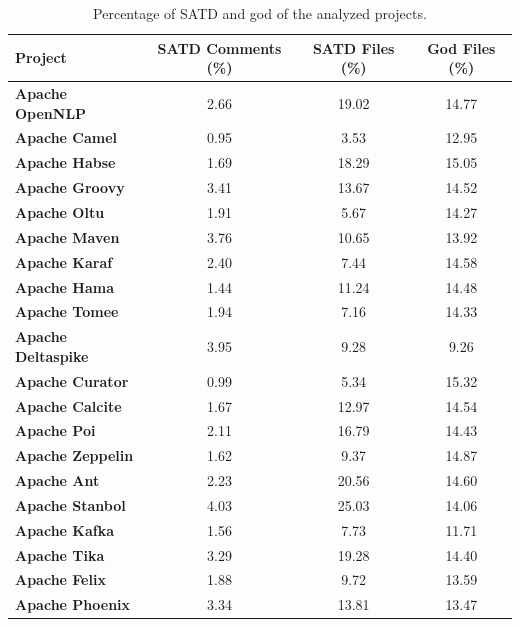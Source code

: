\begin{landscape}
	
	
	\begin{table}[htbp]
		\small
		\centering
		\caption{Percentage of SATD and god of the analyzed projects.}
		\begin{adjustbox}{width=1.0\textwidth}
			
			
			\begin{tabular}{l|c|c|c}
				\hline
				\textbf{Project}  & \textbf{SATD Comments (\%)}  & \textbf{SATD Files (\%)} & \textbf{God Files (\%)} \\ \hline
				\textbf{Apache OpenNLP} &  2.66 & 19.02 & 14.77   \\ \hline
				\textbf{Apache Camel} &  0.95 & 3.53 & 12.95    \\ \hline
				\textbf{Apache Habse} & 1.69 &  18.29 & 15.05    \\ \hline
				\textbf{Apache Groovy} &  3.41 & 13.67 & 14.52    \\ \hline
				\textbf{Apache Oltu} &  1.91 & 5.67 & 14.27    \\ \hline
				\textbf{Apache Maven} &  3.76 & 10.65 & 13.92    \\ \hline
				\textbf{Apache Karaf} &  2.40 & 7.44 & 14.58   \\ \hline
				\textbf{Apache Hama} &  1.44 & 11.24 & 14.48    \\ \hline
				\textbf{Apache Tomee} &  1.94 & 7.16 & 14.33   \\ \hline
				\textbf{Apache Deltaspike} &  3.95 & 9.28 & 9.26    \\ \hline
				\textbf{Apache Curator} &  0.99 & 5.34 & 15.32    \\ \hline
				\textbf{Apache Calcite} &  1.67 & 12.97 & 14.54    \\ \hline
				\textbf{Apache Poi} &  2.11 & 16.79 & 14.43    \\ \hline
				\textbf{Apache Zeppelin} &  1.62 & 9.37 & 14.87    \\ \hline
				\textbf{Apache Ant} &  2.23 & 20.56 & 14.60   \\ \hline
				\textbf{Apache Stanbol} &  4.03 & 25.03 & 14.06   \\ \hline
				\textbf{Apache Kafka} &  1.56 & 7.73 & 11.71    \\ \hline
				\textbf{Apache Tika} &  3.29 & 19.28 & 14.40    \\ \hline
				\textbf{Apache Felix} & 1.88 & 9.72 & 13.59   \\ \hline
				\textbf{Apache Phoenix} &  3.34 & 13.81 & 13.47    \\ \hline
				
			\end{tabular}
			\label{table:projects_satd_god_percentage}
			
		\end{adjustbox}
		
	\end{table}
	
\end{landscape}




